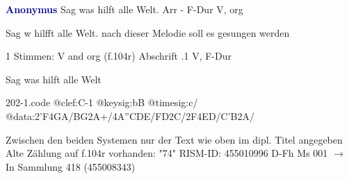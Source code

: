\documentclass[twocolumn]{book}
\begin{document}
\newline \par \vspace{7pt} \textcolor{darkblue}{\textbf{Anonymus  }}
\newline Sag was hilft alle Welt. Arr - F-Dur
\newline V, org
\newline \begin{itshape} Sag w hilfft alle Welt. nach dieser Melodie soll es gesungen werden\end{itshape} 
\newline \textcolor{darkblue}{}  1 Stimmen: V and org  (f.104r)
\newline Abschrift
.1  V, F-Dur
\newline \begin{footnotesize} Sag was hilft alle Welt \end{footnotesize}  
\begin{filecontents*}{202-1.code}
@clef:C-1
@keysig:bB
@timesig:c/
@data:2'F4GA/BG2A+/4A''CDE/FD2C/2F4ED/C'B2A/
\end{filecontents*}
\newline
%
\newline Zwischen den beiden Systemen nur der Text wie oben im dipl. Titel angegeben
\newline Alte Zählung auf f.104r vorhanden: "74"
\newline RISM-ID: 455010996
\newline D-Fh  Ms 001
\newline $\rightarrow$ In Sammlung 418 (455008343)
      
\end{document}

